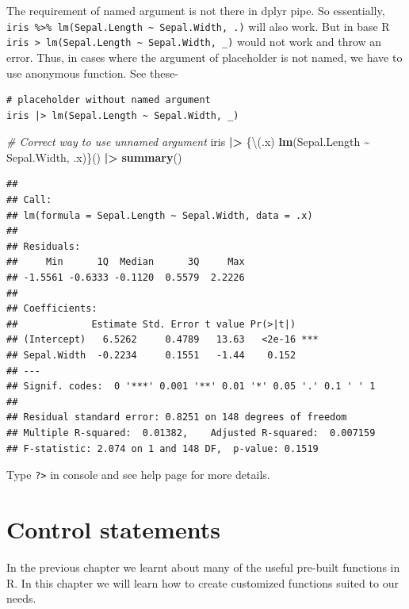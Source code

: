 \documentclass[
]{book}
\newenvironment{Shaded}{\begin{snugshade}}{\end{snugshade}}
\newcommand{\CommentTok}[1]{\textcolor[rgb]{0.56,0.35,0.01}{\textit{#1}}}
\newcommand{\FunctionTok}[1]{\textcolor[rgb]{0.13,0.29,0.53}{\textbf{#1}}}
\newcommand{\NormalTok}[1]{#1}
\newcommand{\SpecialCharTok}[1]{\textcolor[rgb]{0.81,0.36,0.00}{\textbf{#1}}}
\begin{document}
The requirement of named argument is not there in dplyr pipe. So essentially, \texttt{iris\ \%\textgreater{}\%\ lm(Sepal.Length\ \textasciitilde{}\ Sepal.Width,\ .)} will also work. But in base R \texttt{iris\ \textbar{}\textgreater{}\ lm(Sepal.Length\ \textasciitilde{}\ Sepal.Width,\ \_)} would not work and throw an error. Thus, in cases where the argument of placeholder is not named, we have to use anonymous function. See these-

\begin{verbatim}
# placeholder without named argument
iris |> lm(Sepal.Length ~ Sepal.Width, _)
\end{verbatim}

\begin{Shaded}
\begin{Highlighting}[]
\CommentTok{\# Correct way to use unnamed argument}
\NormalTok{iris }\SpecialCharTok{|\textgreater{}}\NormalTok{ \{\textbackslash{}(.x) }\FunctionTok{lm}\NormalTok{(Sepal.Length }\SpecialCharTok{\textasciitilde{}}\NormalTok{ Sepal.Width, .x)\}() }\SpecialCharTok{|\textgreater{}} \FunctionTok{summary}\NormalTok{()}
\end{Highlighting}
\end{Shaded}

\begin{verbatim}
## 
## Call:
## lm(formula = Sepal.Length ~ Sepal.Width, data = .x)
## 
## Residuals:
##     Min      1Q  Median      3Q     Max 
## -1.5561 -0.6333 -0.1120  0.5579  2.2226 
## 
## Coefficients:
##             Estimate Std. Error t value Pr(>|t|)    
## (Intercept)   6.5262     0.4789   13.63   <2e-16 ***
## Sepal.Width  -0.2234     0.1551   -1.44    0.152    
## ---
## Signif. codes:  0 '***' 0.001 '**' 0.01 '*' 0.05 '.' 0.1 ' ' 1
## 
## Residual standard error: 0.8251 on 148 degrees of freedom
## Multiple R-squared:  0.01382,    Adjusted R-squared:  0.007159 
## F-statistic: 2.074 on 1 and 148 DF,  p-value: 0.1519
\end{verbatim}

Type \texttt{?\textasciigrave{}\textbar{}\textgreater{}\textasciigrave{}} in console and see help page for more details.

\hypertarget{control-statements}{%
\chapter{Control statements}\label{control-statements}}

In the previous chapter we learnt about many of the useful pre-built functions in R. In this chapter we will learn how to create customized functions suited to our needs.
\end{document}
